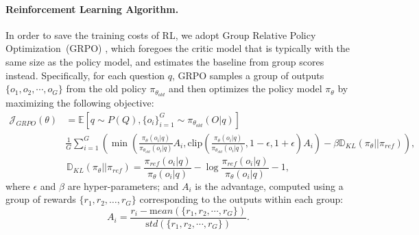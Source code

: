 \documentclass[11pt, a4paper, logo, copyright, nonumbering]{deepseek}
\begin{document}
\begin{CJK*}{UTF8}{gbsn}
\paragraph{Reinforcement Learning Algorithm.}
In order to save the training costs of RL, we adopt Group Relative Policy Optimization~(GRPO) \citep{deepseekmath}, which foregoes the critic model that is typically with the same size as the policy model, and estimates the baseline from group scores instead. 
Specifically, for each question $q$, GRPO samples a group of outputs $\{o_1, o_2, \cdots, o_G\}$ from the old policy $\pi_{\theta_{old}}$ and then optimizes the policy model $\pi_{\theta}$ by maximizing the following objective:
\begin{equation}
\begin{split}
    \mathcal{J}_{GRPO}(\theta) &= \mathbb{E}{[q \sim P(Q), \{o_i\}_{i=1}^G \sim \pi_{\theta_{old}}(O|q)]}  \\
    & \frac{1}{G}\sum_{i=1}^G \left( \min \left( \frac{\pi_\theta(o_i |q)}{\pi_{\theta_{old}}(o_i |q)} A_i, \text{clip} \left( \frac{\pi_\theta(o_i |q)}{\pi_{\theta_{old}}(o_i |q)}, 1 - \epsilon, 1 + \epsilon \right)  A_i \right) - \beta \mathbb{D}_{KL}\left(\pi_{\theta} || \pi_{ref}\right)\right) ,
\end{split}
\label{eq:GRPO-obj}
\end{equation}
\begin{equation}
    \mathbb{D}_{KL}\left(\pi_{\theta} || \pi_{ref}\right) = \frac{\pi_{ref}(o_i|q)}{\pi_{\theta}(o_i|q)}- \log\frac{\pi_{ref}(o_i|q)}{\pi_{\theta}(o_i|q)} - 1,
\end{equation}
where $\epsilon$ and $\beta$ are hyper-parameters; 
and $A_i$ is the advantage, computed using a group of rewards $\{r_1, r_2, \ldots, r_G\}$ corresponding to the outputs within each group:
\begin{equation}
    A_i = \frac{r_i - {\mathrm mean(\{r_1, r_2, \cdots, r_G\})}}{{\mathrm std(\{r_1, r_2, \cdots, r_G\})}}.
\end{equation}


\end{CJK*}
\end{document}
